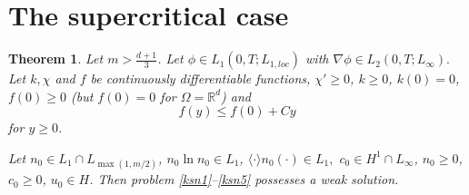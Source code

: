 \documentclass[10pt]{amsart}
\newtheorem {theorem} {Theorem} [section]
\begin{document}
\section{The supercritical case}

\begin{theorem} \label{mb1} Let $m>\frac {d+1} 3$. Let $\phi\in L_1(0,T; L_{1,loc})$ with $\nabla\phi\in L_2(0,T; L_\infty).$ Let $k,\chi$ and $f$ be continuously differentiable functions, $\chi'\geq 0$, $k\geq 0$, $k(0)= 0$, $f(0)\geq 0$ (but $f(0)= 0$ for $\Omega={\mathbb{R}}^d$) and \begin{equation} \label{asf1} f(y)\leq f(0)+Cy \end{equation} for $y\geq 0$. 

Let $n_0\in L_1 \cap L_{\max(1,m/2)}$, $n_0 \ln n_0 \in L_1$, $ \langle\cdot\rangle n_0(\cdot)\in L_1,$ $c_0 \in H^1\cap L_{\infty}$, $n_0 \geq 0$, $c_0 \geq 0$, $u_0 \in H$. Then problem \eqref{ksn1}--\eqref{ksn5} possesses a weak solution. 
\end{theorem}
\end{document}
